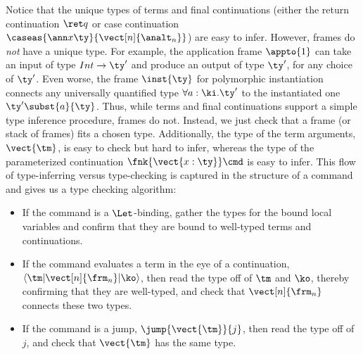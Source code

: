 \documentclass{article}
\begin{document}
Notice that the unique types of terms and final continuations (either the return
continuation $\ret q$ or case continuation
$\caseas{\ann x \ty}{\vect[n]{\analt_n}}$) are easy to infer.  However, frames
do \emph{not} have a unique type.  For example, the application frame
$\appto{1}$ can take an input of type $Int \to \ty'$ and produce an output of
type $\ty'$, for any choice of $\ty'$.  Even worse, the frame $\inst{\ty}$ for
polymorphic instantiation connects any universally quantified type
$\forall a:\ki.\ty'$ to the instantiated one $\ty'\subst{a}{\ty}$.  Thus, while
terms and final continuations support a simple type inference procedure, frames
do not.  Instead, we just check that a frame (or stack of frames) fits a chosen
type.  Additionally, the type of the term arguments, $\vect{\tm}$, is easy to
check but hard to infer, whereas the type of the parameterized continuation
$\fnk{\vect{x:\ty}}\cmd$ is easy to infer.  This flow of type-inferring versus
type-checking is captured in the structure of a command and gives us a type
checking algorithm:
\begin{itemize}
\item If the command is a $\Let$-binding, gather the types for the bound local
  variables and confirm that they are bound to well-typed terms and
  continuations.
\item If the command evaluates a term in the eye of a continuation,
  $\braket{\tm | \vect[n]{\frm_n} | \ko}$, then read the type off of $\tm$ and
  $\ko$, thereby confirming that they are well-typed, and check that
  $\vect[n]{\frm_n}$ connects these two types.
\item If the command is a jump, $\jump{\vect{\tm}}{j}$, then read the type off
  of $j$, and check that $\vect{\tm}$ has the same type.
\end{itemize}
\end{document}
